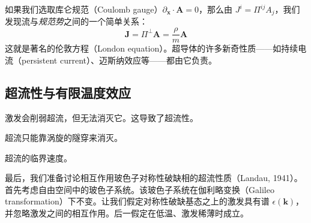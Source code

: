 如果我们选取库仑规范（Coulomb gauge）$\partial_{\pmb{x}}\cdot\pmb{A}=0$，那么由 $J^i=\Pi^{ij}A_j$，我们发现流与\emph{规范势}之间的一个简单关系：
\begin{equation*}
\pmb{J}=\Pi^{\perp}\pmb{A}=\frac{\rho}{m}\pmb{A} \tag{3.7.11}
\end{equation*}
这就是著名的伦敦方程（London equation）。超导体的许多新奇性质——如持续电流（persistent current）、迈斯纳效应等——都由它负责。

\subsection{超流性与有限温度效应}

\begin{keypoints}
\item 激发会削弱超流，但无法消灭它。这导致了超流性。
\item 超流只能靠涡旋的隧穿来消灭。
\item 超流的临界速度。
\end{keypoints}

最后，我们准备讨论相互作用玻色子对称性破缺相的超流性质（Landau, 1941）。首先考虑自由空间中的玻色子系统。该玻色子系统在伽利略变换（Galileo transformation）下不变。让我们假定对称性破缺基态之上的激发具有谱 $\epsilon(\pmb{k})$，并忽略激发之间的相互作用。后一假定在低温、激发稀薄时成立。

